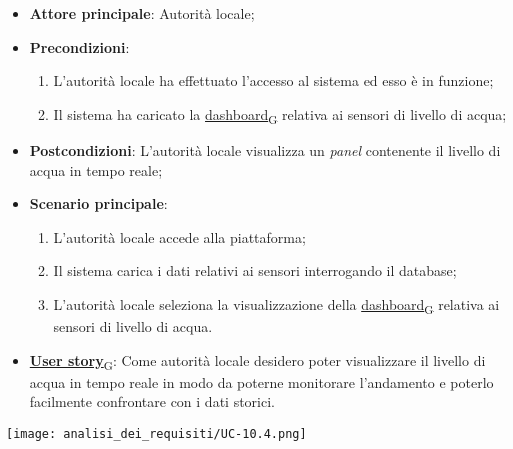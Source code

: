 \begin{itemize}
	\item \textbf{Attore principale}: Autorità locale;
	\item \textbf{Precondizioni}:
	      \begin{enumerate}
		      \item L'autorità locale ha effettuato l'accesso al sistema ed esso è in funzione;
		      \item Il sistema ha caricato la \href{https://7last.github.io/docs/rtb/documentazione-interna/glossario\#dashboard}{dashboard\textsubscript{G}} relativa ai sensori di livello di acqua;
	      \end{enumerate}
	\item \textbf{Postcondizioni}: L'autorità locale visualizza un \textit{panel} contenente il livello di acqua in tempo reale;
	\item \textbf{Scenario principale}:
	      \begin{enumerate}
		      \item L'autorità locale accede alla piattaforma;
		      \item Il sistema carica i dati relativi ai sensori interrogando il database;
		      \item L'autorità locale seleziona la visualizzazione della \href{https://7last.github.io/docs/rtb/documentazione-interna/glossario\#dashboard}{dashboard\textsubscript{G}} relativa ai sensori di livello di acqua.
	      \end{enumerate}
	\item \href{https://7last.github.io/docs/rtb/documentazione-interna/glossario\#user-story}{\textbf{User story}\textsubscript{G}}:
	      Come autorità locale desidero poter visualizzare il livello di acqua in tempo reale in modo da poterne monitorare l'andamento
	      e poterlo facilmente confrontare con i dati storici.
\end{itemize}
\begin{center}
	\texttt{[image: analisi\_dei\_requisiti/UC-10.4.png]}
\end{center}

